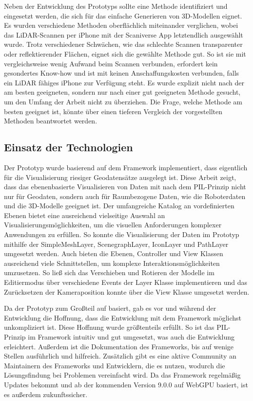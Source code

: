 Neben der Entwicklung des Prototyps sollte eine Methode identifiziert und eingesetzt werden, die sich für das einfache Generieren von 3D-Modellen eignet. Es wurden verschiedene Methoden oberflächlich miteinander verglichen, wobei das \ac{LiDAR}-Scannen per iPhone mit der Scaniverse App letztendlich ausgewählt wurde. Trotz verschiedener Schwächen, wie das schlechte Scannen transparenter oder reflektierender Flächen, eignet sich die gewählte Methode gut. So ist sie mit vergleichsweise wenig Aufwand beim Scannen verbunden, erfordert kein gesondertes Know-how und ist mit keinen Anschaffungskosten verbunden, falls ein \ac{LiDAR} fähiges iPhone zur Verfügung steht. Es wurde explizit nicht nach der am besten geeigneten, sondern nur nach einer gut geeigneten Methode gesucht, um den Umfang der Arbeit nicht zu überziehen. Die Frage, welche Methode am besten geeignet ist, könnte über einen tieferen Vergleich der vorgestellten Methoden beantwortet werden.

\subsection{Einsatz der Technologien}
Der Prototyp wurde basierend auf dem Framework \deckgl{} implementiert, dass eigentlich für die Visualisierung riesiger Geodatensätze ausgelegt ist. Diese Arbeit zeigt, dass das ebenenbasierte Visualisieren von Daten mit \deckgl{} nach dem \ac{PIL}-Prinzip nicht nur für Geodaten, sondern auch für Raumbezogene Daten, wie die Roboterdaten und die 3D-Modelle geeignet ist. Der umfangreiche Katalog an vordefinierten Ebenen bietet eine ausreichend vielseitige Auswahl an Visualisierungsmöglichkeiten, um die visuellen Anforderungen komplexer Anwendungen zu erfüllen. So konnte die Visualisierung der Daten im Prototyp mithilfe der SimpleMeshLayer, ScenegraphLayer, IconLayer und PathLayer umgesetzt werden. Auch bieten die Ebenen, Controller und View Klassen ausreichend viele Schnittstellen, um komplexe Interaktionsmöglichkeiten umzusetzen. So ließ sich das Verschieben und Rotieren der Modelle im Editiermodus über verschiedene Events der Layer Klasse implementieren und das Zurücksetzen der Kameraposition konnte über die View Klasse umgesetzt werden.

Da der Prototyp zum Großteil auf \deckgl{} basiert, gab es vor und während der Entwicklung die Hoffnung, dass die Entwicklung mit dem Framework möglichst unkompliziert ist. Diese Hoffnung wurde größtenteils erfüllt. So ist das \ac{PIL}-Prinzip im Framework intuitiv und gut umgesetzt, was auch die Entwicklung erleichtert. Außerdem ist die Dokumentation des Frameworks, bis auf wenige Stellen ausführlich und hilfreich. Zusätzlich gibt es eine aktive Community an Maintainern des Frameworks und Entwicklern, die es nutzen, wodurch die Lösungsfindung bei Problemen vereinfacht wird. Da das Framework regelmäßig Updates bekommt und ab der kommenden Version 9.0.0 auf WebGPU basiert, ist es außerdem zukunftssicher.

